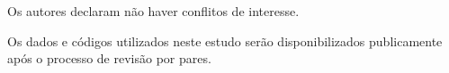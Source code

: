 \documentclass[portuguese]{sbc2025}%
\begin{document}
\begin{declarations}









\begin{interests}
  Os autores declaram não haver conflitos de interesse.
\end{interests}

\begin{materials}
  Os dados e códigos utilizados neste estudo serão disponibilizados publicamente após o processo de revisão por pares.
\end{materials}

  

\end{declarations}



\end{document}
